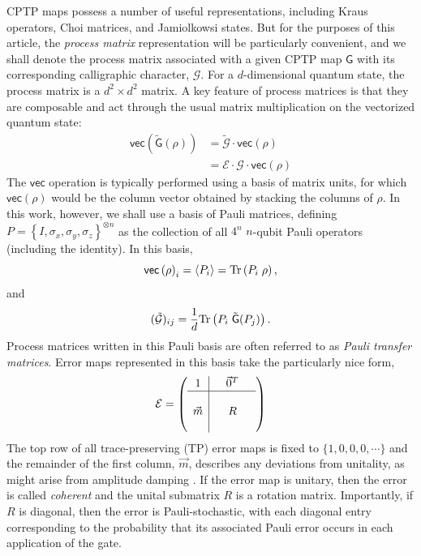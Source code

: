 \documentclass[aps,nofootinbib,pra,notitlepage,twocolumn]{revtex4-1}
\newcommand{\tr}{{\rm Tr\thinspace}}
\newcommand{\expect}[1]{\ensuremath{\left\langle{#1}\right\rangle}}
\newcommand{\actual}{\ensuremath{\tilde{\mathsf{G}}}}
\newcommand{\actmat}{\ensuremath{\tilde{\mathcal{G}}}}
\newcommand{\target}{\ensuremath{{\mathsf{G}}}}
\newcommand{\tarmat}{\ensuremath{{\mathcal{G}}}}
\newcommand{\errmat}{\ensuremath{{\mathcal{E}}}}
\newcommand{\vectorize}[1]{\ensuremath{\mathsf{vec}\left(#1\right)}}
\newcommand{\0}{\ensuremath{\mathbf{0}}}
\begin{document}
CPTP maps possess a number of useful representations, including Kraus operators\cite{1983}, Choi matrices\cite{Choi1975}, and Jamiolkowsi states\cite{yczkowski2004}. But for the purposes of this article, the \emph{process matrix} representation will be particularly convenient\cite{OBrien2004}, and we shall denote the process matrix associated with a given CPTP map $\target$ with its corresponding calligraphic character, $\tarmat$. For a $d$-dimensional quantum state, the process matrix is a $d^2\times d^2$ matrix. A key feature of process matrices is that they are composable and act through the usual matrix multiplication on the vectorized quantum state:
\begin{align}
	\vectorize{\actual(\rho)}
		&= \actmat\cdot\vectorize{\rho} \\
		&= \errmat\cdot\tarmat\cdot\vectorize{\rho}
\end{align}
The $\mathsf{vec}$ operation is typically performed using a basis of matrix units, for which $\vectorize{\rho}$ would be the column vector obtained by stacking the columns of $\rho$. In this work, however, we shall use a basis of Pauli matrices, defining $P = \left\{I, \sigma_x, \sigma_y, \sigma_z\right\}^{\otimes n}$ as the collection of all $4^n$ $n$-qubit Pauli operators (including the identity).  In this basis,
\begin{equation}
  \vectorize{\rho}_i = \expect{P_i} = \tr\!\left(P_i\; \rho \right),
\end{equation}
and
\begin{equation}
	(\actmat)_{ij} = \frac{1}{d}\tr\!\left(P_i \;\actual\!\left(P_j\right) \right).
\end{equation}
Process matrices written in this Pauli basis are often referred to as \emph{Pauli transfer matrices}\cite{Chow2012}.  Error maps represented in this basis take the particularly nice form,
\begin{equation}\label{eq:process_matrix}
\errmat =
	\left(\begin{array}{c|cccc}
		1 &  & \vec{0}^T & \\ 
		\hline & &  &  \\
		\vec{m} &  & R &  \\
		 &  &  & 
	\end{array} 	
	\right)
\end{equation}
The top row of all trace-preserving (TP) error maps is fixed to $\{1,0,0,0,\cdots\}$ and the remainder of the first column, $\vec{m}$, describes any deviations from unitality, as might arise from amplitude damping \cite{preskill1997lecture}. If the error map is unitary, then the error is called \textit{coherent} and the unital submatrix $R$ is a rotation matrix.  Importantly, if $R$ is diagonal, then the error is Pauli-stochastic, with each diagonal entry corresponding to the probability that its associated Pauli error occurs in each application of the gate.
\end{document}
